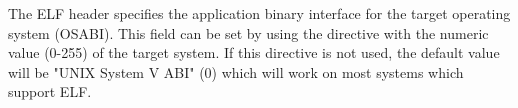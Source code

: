 The ELF header specifies the application binary interface for the
target operating system (OSABI). This field can be set by using the
 directive with the numeric value (0-255) of the target
system. If this directive is not used, the default value will be "UNIX
System V ABI" (0) which will work on most systems which support ELF.
%
%
%
%
%
%
%
%
%
%
%
%
